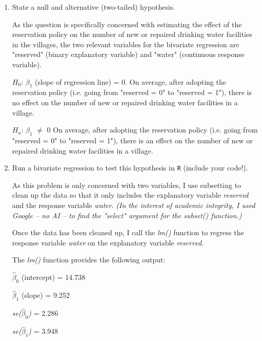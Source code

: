 \documentclass[12pt,letterpaper]{article}
\begin{document}
\newpage
\begin{enumerate}
	\item [(a)] State a null and alternative (two-tailed) hypothesis. 
	
	
	
As the question is specifically concerned with estimating the effect of the reservation policy on the number of new or repaired drinking water facilities in the villages, the two relevant variables for the bivariate regression are "reserved" (binary explanatory variable) and "water" (continuous response variable).
	
$H_0$: $\beta_1$ (slope of regression line) = 0. On average, after adopting the  reservation policy (i.e. going from "reserved = 0" to "reserved = 1"),  there is no effect on the number of new or repaired drinking water  facilities in a village. 
	
$H_a$: $\beta_1$ $\neq$ 0 On average, after adopting the  reservation policy (i.e. going from "reserved = 0" to "reserved = 1"),  there is an effect on the number of new or repaired drinking water facilities in a village. 
	
	\vspace{1cm}
	\item [(b)] Run a bivariate regression to test this hypothesis in \texttt{R} (include your code!).
	
	 
	
	As this problem is only concerned with two variables, I use subsetting to clean up the data so that it only includes the explanatory variable \textit{reserved} and the response variable \textit{water}. \textit{(In the interest of academic integrity, I used Google -- no AI -- to find the "select" argument for the subset() function.)}
	
	Once the data has been cleaned up, I call the \textit{lm()} function to regress the response variable \textit{water} on the explanatory variable \textit{reserved}.
	
	The \textit{lm()} function provides the following output: \vspace{0.5cm}
	
	$\hat{\beta}_0$ (intercept) = 14.738 
	
	$\hat{\beta}_1$ (slope) = 9.252
	
	\textit{se($\hat{\beta}_0$)} = 2.286
	
	\textit{se($\hat{\beta}_1$)} = 3.948
	

\end{enumerate}
\end{document}
